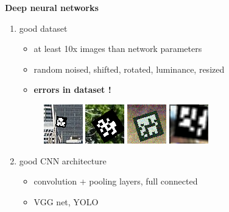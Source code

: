 \documentclass[xcolor=dvipsnames]{beamer}
\begin{document}
\begin{frame}{\bf Deep neural networks}

\begin{enumerate}
    \item good dataset
        \begin{itemize}
            \item at least 10x images than network parameters
            \item random noised, shifted, rotated, luminance, resized
            \item {\bf \color{red} errors in dataset !}
        \end{itemize}

        \begin{figure}[!htb]
          \centering
          \includegraphics[scale=0.7]{../../pictures/image_processing/dataset_example/0.png}
          \includegraphics[scale=0.7]{../../pictures/image_processing/dataset_example/1.png}
          \includegraphics[scale=0.7]{../../pictures/image_processing/dataset_example/2.png}
          \includegraphics[scale=0.7]{../../pictures/image_processing/dataset_example/3.png}
        \end{figure}
    \item good CNN architecture
        \begin{itemize}
            \item convolution + pooling layers, full connected
            \item VGG net, YOLO
        \end{itemize}
\end{enumerate}

\end{frame}
\end{document}
